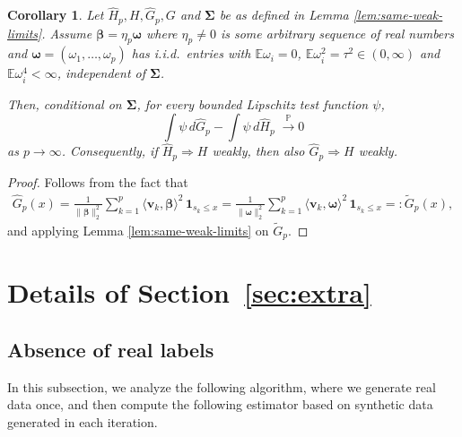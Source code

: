 \documentclass[10pt]{article}
\newtheorem{corollary}{Corollary}
\numberwithin{thm}{section}
\numberwithin{remark}{section}
\numberwithin{ex}{section}
\numberwithin{ass}{section}
\numberwithin{defn}{section}
\numberwithin{lemma}{section}
\numberwithin{corollary}{section}
\numberwithin{prop}{section}
\newcommand{\ee}{\mathbb{E}}
\def \bbeta{\pmb{\beta}}
\newcommand{\bSigma}{ { \Sigma} }
\def\bSigma{{\boldsymbol\Sigma}}
\numberwithin{equation}{section}
\renewcommand{\hat}{\widehat}
\renewcommand{\tilde}{\widetilde}
\begin{document}
\begin{corollary}\label{cor:rf_equiv}
Let $\hat H_p, H, \hat G_p, G$ and $\bSigma$ be as defined in Lemma \ref{lem:same-weak-limits}.
Assume $\bbeta= \eta_p \pmb\omega$ where $\eta_p \ne 0$ is some arbitrary sequence of real numbers and $\pmb\omega = (\omega_1,\dots,\omega_p)$ has i.i.d.\ entries with $\ee\omega_i=0$,
$\ee\omega_i^2=\tau^2 \in(0,\infty)$ and $\ee\omega_i^4<\infty$, independent of $\bSigma$.

Then, conditional on $\bSigma$, for every bounded Lipschitz test function $\psi$,
\[
  \int \psi\, d\hat G_p - \int \psi\, d\hat H_p \;\xrightarrow{\mathbb{P}} 0
\]
as $p \rightarrow \infty$. Consequently, if $\hat H_p \Rightarrow H$ weakly, then also $\hat G_p \Rightarrow H$ weakly.
\end{corollary}
\begin{proof}
Follows from the fact that
\begin{align*}
  \hat G_p(x)=\frac{1}{\|\bbeta\|_2^2}\sum_{k=1}^p \langle \boldsymbol v_k,\bbeta\rangle^2\,\mathbf 1_{s_k\le x} =\frac{1}{\|\pmb\omega\|_2^2}\sum_{k=1}^p \langle \boldsymbol v_k,\pmb\omega\rangle^2\,\mathbf 1_{s_k\le x} =: \tilde G_p(x),
\end{align*}
and applying Lemma \ref{lem:same-weak-limits} on $\tilde G_p$.
\end{proof}

\section{Details of Section~\ref{sec:extra}}

\subsection{Absence of real labels}
In this subsection, we analyze the following algorithm, where we generate real data once, and then compute the following estimator based on synthetic data generated in each iteration.
\end{document}

